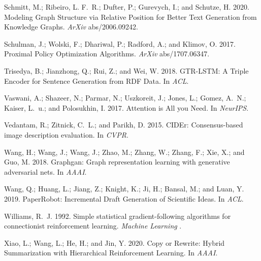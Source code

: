 \documentclass[letterpaper]{article}
\begin{document}
\begin{thebibliography}{43}
Schmitt, M.; Ribeiro, L. F.~R.; Dufter, P.; Gurevych, I.; and Schutze, H. 2020.
\newblock Modeling Graph Structure via Relative Position for Better Text
  Generation from Knowledge Graphs.
\newblock \emph{ArXiv} abs/2006.09242.

Schulman, J.; Wolski, F.; Dhariwal, P.; Radford, A.; and Klimov, O. 2017.
\newblock Proximal Policy Optimization Algorithms.
\newblock \emph{ArXiv} abs/1707.06347.

Trisedya, B.; Jianzhong, Q.; Rui, Z.; and Wei, W. 2018.
\newblock GTR-LSTM: A Triple Encoder for Sentence Generation from RDF Data.
\newblock In \emph{ACL}.

Vaswani, A.; Shazeer, N.; Parmar, N.; Uszkoreit, J.; Jones, L.; Gomez, A.~N.;
  Kaiser, L.~u.; and Polosukhin, I. 2017.
\newblock Attention is All you Need.
\newblock In \emph{NeurIPS}.

Vedantam, R.; Zitnick, C.~L.; and Parikh, D. 2015.
\newblock CIDEr: Consensus-based image description evaluation.
\newblock In \emph{CVPR}.

Wang, H.; Wang, J.; Wang, J.; Zhao, M.; Zhang, W.; Zhang, F.; Xie, X.; and Guo,
  M. 2018.
\newblock Graphgan: Graph representation learning with generative adversarial
  nets.
\newblock In \emph{AAAI}.

Wang, Q.; Huang, L.; Jiang, Z.; Knight, K.; Ji, H.; Bansal, M.; and Luan, Y.
  2019.
\newblock PaperRobot: Incremental Draft Generation of Scientific Ideas.
\newblock In \emph{ACL}.

Williams, R.~J. 1992.
\newblock Simple statistical gradient-following algorithms for connectionist
  reinforcement learning.
\newblock \emph{Machine Learning} .

Xiao, L.; Wang, L.; He, H.; and Jin, Y. 2020.
\newblock Copy or Rewrite: Hybrid Summarization with Hierarchical Reinforcement
  Learning.
\newblock In \emph{AAAI}.


\end{thebibliography}
\end{document}
